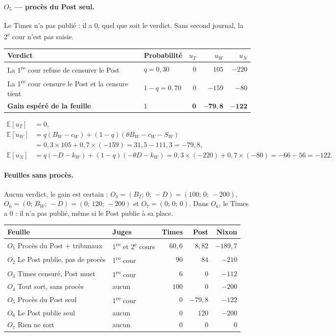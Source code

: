 \documentclass[11pt,a4paper]{article}
\theoremstyle{definition}
\newcommand{\E}{\mathbb{E}}
\begin{document}
\paragraph{$O_5$ — procès du Post seul.} Le Times n'a pas publié : il a $0$, quel que soit le verdict. Sans second journal, la 2\textsuperscript{e} cour n'est pas saisie.
\begin{center}
\footnotesize
\begin{tabularx}{\textwidth}{@{}>{\raggedright\arraybackslash}Xlrrr@{}}
\toprule
Verdict & Probabilité & $u_T$ & $u_W$ & $u_N$ \\
\midrule
La 1\textsuperscript{re} cour refuse de censurer le Post & $q=0,30$ & $0$ & $105$ & $-220$ \\
La 1\textsuperscript{re} cour censure le Post et la censure tient & $1-q=0,70$ & $0$ & $-159$ & $-80$ \\
\midrule
\textbf{Gain espéré de la feuille} & $1$ & $\mathbf{0}$ & $\mathbf{-79,8}$ & $\mathbf{-122}$ \\
\bottomrule
\end{tabularx}
\end{center}
\begin{align*}
\E[u_T] &= 0,\\
\E[u_W] &= q(B_W-c_W)+(1-q)(\theta B_W-c_W-S_W)\\
&= 0,3\times105+0,7\times(-159) = 31,5-111,3 = -79,8,\\[3pt]
\E[u_N] &= q(-D-k_W)+(1-q)(-\theta D-k_W) = 0,3\times(-220)+0,7\times(-80) = -66-56 = -122.
\end{align*}

\paragraph{Feuilles sans procès.} Aucun verdict, le gain est certain : $O_4=(B_T;\,0;\,-D)=(100;\,0;\,-200)$, $O_6=(0;\,B_W;\,-D)=(0;\,120;\,-200)$ et $O_7=(0;\,0;\,0)$. Dans $O_6$, le Times a $0$ : il n'a pas publié, même si le Post publie à sa place.

\begin{center}
\small
\begin{tabular}{@{}llrrr@{}}
\toprule
Feuille & Juges & Times & Post & Nixon \\
\midrule
$O_1$ Procès du Post + tribunaux & 1\textsuperscript{re} et 2\textsuperscript{e} cours & $60,6$ & $8,82$ & $-189,7$ \\
$O_2$ Le Post publie, pas de procès & 1\textsuperscript{re} cour & $90$ & $84$ & $-210$ \\
$O_3$ Times censuré, Post muet & 1\textsuperscript{re} cour & $6$ & $0$ & $-112$ \\
$O_4$ Tout sort, sans procès & aucun & $100$ & $0$ & $-200$ \\
$O_5$ Procès du Post seul & 1\textsuperscript{re} cour & $0$ & $-79,8$ & $-122$ \\
$O_6$ Le Post publie seul & aucun & $0$ & $120$ & $-200$ \\
$O_7$ Rien ne sort & aucun & $0$ & $0$ & $0$ \\
\bottomrule
\end{tabular}
\end{center}
\end{document}
